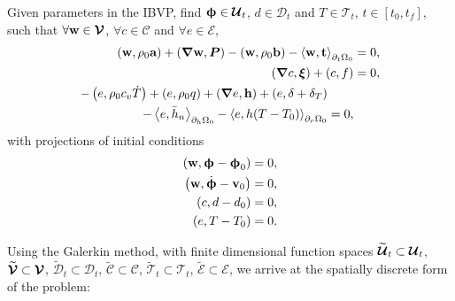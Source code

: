 \begin{mdframed}[
    frametitle={The weak form},
    frametitlebackgroundcolor=gray!20,
    backgroundcolor=gray!5,
    linewidth=0pt,
    nobreak=true
  ]
  Given parameters in the IBVP, find $\boldsymbol{\upphi} \in \boldsymbol{\mathcal{U}}_t$, $d \in \mathcal{D}_t$ and $T \in \mathcal{T}_t$, $t \in [t_0, t_f]$, such that $\forall \textbf{w} \in \boldsymbol{\mathcal{V}}$, $\forall c \in \mathcal{C}$ and $\forall e \in \mathcal{E}$,
  \begin{subequations}
    \begin{align}
      \left( \textbf{w}, \rho_0\textbf{a} \right) + \left( \boldsymbol{\nabla} \textbf{w}, \boldsymbol{P} \right) - \left( \textbf{w}, \rho_0 \textbf{b} \right) - \left< \textbf{w}, \textbf{t} \right>_{\partial_t\Omega_0} &= 0,    \\
      \left( \boldsymbol{\nabla} c, \boldsymbol{\xi} \right) + \left( c, f \right) &= 0, \\
      \begin{split}
        - \left( e, \rho_0c_v\dot{T} \right) + \left( e, \rho_0q \right) + \left( \boldsymbol{\nabla} e, \textbf{h} \right) + \left( e, \delta+\delta_T \right)& \\
        - \left< e, \bar{h}_n \right>_{\partial_h\Omega_0} - \left< e, h(T-T_0) \right>_{\partial_r\Omega_0} &= 0,
      \end{split} 
    \end{align}
  \end{subequations}
  with projections of initial conditions
  \begin{subequations}
  \begin{align}
      \left( \textbf{w}, \boldsymbol{\upphi} - \boldsymbol{\upphi}_0 \right) &= 0, \\
      \left( \textbf{w}, \dot{\boldsymbol{\upphi}} - \textbf{v}_0 \right) &= 0, \\
      \left( c, d - d_0 \right) &= 0, \\
      \left( e, T - T_0 \right) &= 0.
  \end{align}
  \end{subequations}
\end{mdframed}
Using the Galerkin method, with finite dimensional function spaces $\widetilde{\boldsymbol{\mathcal{U}}}_t \subset \boldsymbol{\mathcal{U}}_t$, $\widetilde{\boldsymbol{\mathcal{V}}} \subset \boldsymbol{\mathcal{V}}$, $\widetilde{\mathcal{D}}_t \subset \mathcal{D}_t$, $\widetilde{\mathcal{C}} \subset \mathcal{C}$, $\widetilde{\mathcal{T}}_t \subset \mathcal{T}_t$, $\widetilde{\mathcal{E}} \subset \mathcal{E}$, we arrive at the spatially discrete form of the problem:

